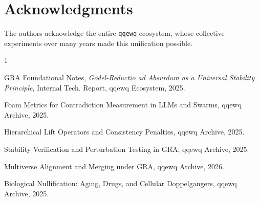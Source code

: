 \documentclass[11pt,a4paper]{article}
\begin{document}
\section*{Acknowledgments}
The authors acknowledge the entire \texttt{qqewq} ecosystem, whose collective experiments over many years made this unification possible.

\begin{thebibliography}{1}

GRA Foundational Notes, \textit{Gödel-Reductio ad Absurdum as a Universal Stability Principle}, Internal Tech. Report, qqewq Ecosystem, 2025.

Foam Metrics for Contradiction Measurement in LLMs and Swarms, qqewq Archive, 2025.

Hierarchical Lift Operators and Consistency Penalties, qqewq Archive, 2025.

Stability Verification and Perturbation Testing in GRA, qqewq Archive, 2025.

Multiverse Alignment and Merging under GRA, qqewq Archive, 2026.

Biological Nullification: Aging, Drugs, and Cellular Doppelgangers, qqewq Archive, 2025.

\end{thebibliography}
\end{document}
